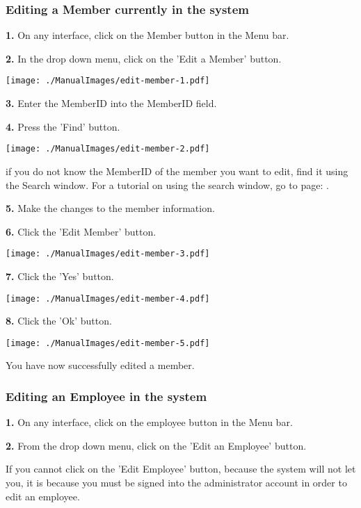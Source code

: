 \pagebreak
\subsubsection{Editing a Member currently in the system}
\label{fig:Editing a Member currently in the system}

\textbf{1.} On any interface, click on the Member button in the Menu bar.

\textbf{2.} In the drop down menu, click on the 'Edit a Member' button.

\texttt{[image: ./ManualImages/edit-member-1.pdf]}

\textbf{3.} Enter the MemberID into the MemberID field. 

\textbf{4.} Press the 'Find' button.

\texttt{[image: ./ManualImages/edit-member-2.pdf]}

if you do not know the MemberID of the member you want to edit, find it using the Search window. For a tutorial on using the search window, go to page: . 

\textbf{5.} Make the changes to the member information.

\textbf{6.}  Click the 'Edit Member' button.

\texttt{[image: ./ManualImages/edit-member-3.pdf]}

\textbf{7.}  Click the 'Yes' button.

\texttt{[image: ./ManualImages/edit-member-4.pdf]}

\textbf{8.} Click the 'Ok' button.

\texttt{[image: ./ManualImages/edit-member-5.pdf]}

You have now successfully edited a member.

\pagebreak
\subsubsection{Editing an Employee in the system}
\label{fig:Editing an Employee in the system}

\textbf{1.} On any interface, click on the employee button in the Menu bar.

\textbf{2.} From the drop down menu, click on the 'Edit an Employee' button.

If you cannot click on the 'Edit Employee' button, because the system will not let you, it is because you must be signed into the administrator account in order to edit an employee.

